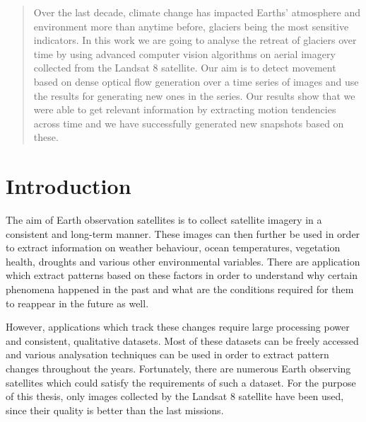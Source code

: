 \documentclass[12pt, a4paper]{report}
\begin{document}
	\begin{abstract} %
		\vspace{1.0cm}
		\vspace{1.0cm}
		\par Over the last decade, climate change has impacted Earths' atmosphere and environment more than anytime before, glaciers being the most sensitive indicators. In this work we are going to analyse the retreat of glaciers over time by using advanced computer vision algorithms on aerial imagery collected from the Landsat 8 satellite. Our aim is to detect movement based on dense optical flow generation over a time series of images and use the results for generating new ones in the series. Our results show that we were able to get relevant information by extracting motion tendencies across time and we have successfully generated new snapshots based on these. 
		
	\end{abstract} %

	\newpage{}

	\tableofcontents{}
	\listoffigures{}
	\listoftables{}
	
	\newpage{}

	\chapter{Introduction}
	
	\par The aim of Earth observation satellites is to collect satellite imagery in a consistent and long-term manner. These images can then further be used in order to extract information on weather behaviour, ocean temperatures, vegetation health, droughts and various other environmental variables. There are application which extract patterns based on these factors in order to understand why certain phenomena happened in the past and what are the conditions required for them to reappear in the future as well. 
	
	\par However, applications which track these changes require large processing power and consistent, qualitative datasets. Most of these datasets can be freely accessed and various analysation techniques can be used in order to extract pattern changes throughout the years. Fortunately, there are numerous Earth observing satellites which could satisfy the requirements of such a dataset. For the purpose of this thesis, only images collected by the Landsat 8 satellite have been used, since their quality is better than the last missions.
	
\end{document}
